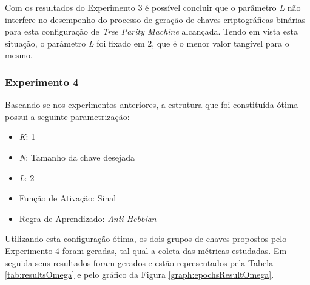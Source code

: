 \documentclass[12pt]{article}
\begin{document}

                
                Com os resultados do Experimento 3 é possível concluir que o parâmetro \textit{L} não interfere no desempenho do processo de geração de chaves criptográficas binárias para esta configuração de \textit{Tree Parity Machine} alcançada. Tendo em vista esta situação, o parâmetro \textit{L} foi fixado em 2, que é o menor valor tangível para o mesmo.
            
            \subsubsection{Experimento 4}
            \label{subsubsec:experimentoOmega}
            
                Baseando-se nos experimentos anteriores, a estrutura que foi constituída ótima possui a seguinte parametrização:
                
                \begin{itemize}
                    \item \textit{K}: 1
                    \item \textit{N}: Tamanho da chave desejada
                    \item \textit{L}: 2
                    \item Função de Ativação: Sinal
                    \item Regra de Aprendizado: \textit{Anti-Hebbian}
                \end{itemize}
                
                
                Utilizando esta configuração ótima, os dois grupos de chaves propostos pelo Experimento 4 foram geradas, tal qual a coleta das métricas estudadas. Em seguida seus resultados foram gerados e estão representados pela Tabela \ref{tab:resultsOmega} e pelo gráfico da Figura \ref{graph:epochsResultOmega}.
                
\end{document}
